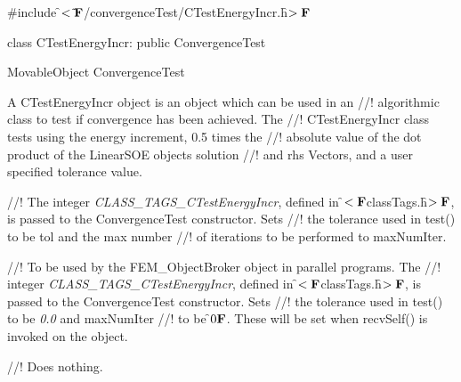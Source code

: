
\indent \#include \f$<\tilde{}{\bf F}$/convergenceTest/CTestEnergyIncr.h\f$>{\bf F}$

\indent class CTestEnergyIncr: public ConvergenceTest

\indent MovableObject
\indent\indent ConvergenceTest
\indent\indent{}

\indent A CTestEnergyIncr object is an object which can be used in an
//! algorithmic class to test if convergence has been achieved. The
//! CTestEnergyIncr class tests using the energy increment, 0.5 times the
//! absolute value of the dot product of the LinearSOE objects solution
//! and rhs Vectors, and a user specified tolerance value.


\indent{} 
\indent{}  
\indent{}
\indent{} 
\indent{}
\indent{} 
\indent{}
\indent{}
\indent{}
\indent{}
\indent{} 
\indent{} 

//! The integer {\em CLASS\_TAGS\_CTestEnergyIncr}, defined in
\f$<{\bf F}$classTags.h\f$>{\bf F}$, is passed to the ConvergenceTest constructor. Sets
//! the tolerance used in test() to be \p tol and the max number
//! of iterations to be performed to \p maxNumIter.

//! To be used by the FEM\_ObjectBroker object in parallel programs. The
//! integer {\em CLASS\_TAGS\_CTestEnergyIncr}, defined in
\f$<{\bf F}$classTags.h\f$>{\bf F}$, is passed to the ConvergenceTest constructor. Sets
//! the tolerance used in test() to be {\em 0.0} and \p maxNumIter 
//! to be \f$0{\bf F}$. These will be set when recvSelf() is invoked on the object.


//! Does nothing.

